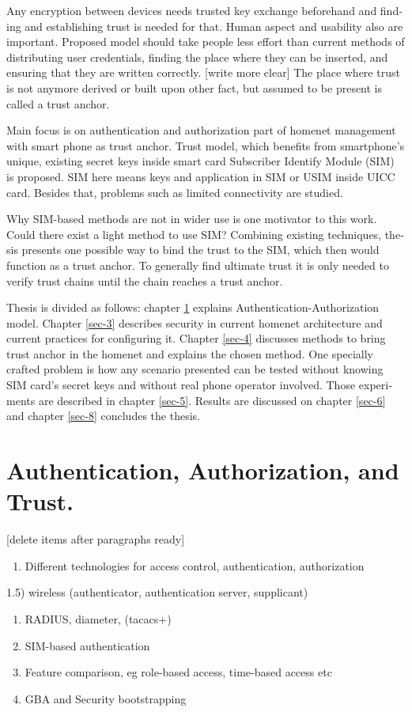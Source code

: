 \documentclass[12pt,a4paper,english]{tutthesis}
\begin{document}
\begin{otherlanguage}{english}
Any encryption between devices needs trusted key exchange
beforehand and finding and establishing trust is needed for that.
Human aspect and usability also are important. Proposed model should
take people less effort than current methods of distributing user
credentials, finding the place where they can be inserted, and
ensuring that they are written correctly. [write more clear]
The place where trust is not anymore derived or built upon other 
fact, but assumed to be present is called a trust anchor.

Main focus is on authentication and authorization part of
homenet management with smart phone as trust anchor.
Trust model, which benefits from smartphone's unique,
existing secret keys inside smart card Subscriber Identify Module
(SIM) is proposed. 
SIM here means keys and application in SIM or USIM inside UICC card. 
Besides that, problems such as limited connectivity are studied. 


Why SIM-based methods are not in wider use is one motivator to
this work. Could there exist a light method to use SIM?  Combining
existing techniques, thesis presents one possible way to bind the trust
to the SIM, which then would function as a trust anchor. To generally
find ultimate trust it is only needed to verify trust chains until the
chain reaches a trust anchor.




Thesis is divided as follows: chapter \ref{sec-2} explains Authentication-Authorization model.
Chapter \ref{sec-3} describes security in current homenet architecture and 
current practices for configuring it.
 Chapter \ref{sec-4}
discusses methods to bring trust anchor in the homenet and explains
the chosen method.
One specially crafted problem is how any scenario presented can be
tested without knowing SIM card's secret keys and without real phone
operator involved.  Those experiments are described in chapter
\ref{sec-5}.
Results are discussed on chapter  \ref{sec-6} and chapter \ref{sec-8} concludes the
thesis.
\chapter{Authentication, Authorization, and Trust.}
\label{sec-2}

[delete items after paragraphs ready]
\begin{enumerate}
\item Different technologies for access control, authentication,
authorization
\end{enumerate}
1.5) wireless (authenticator, authentication server, supplicant)
\begin{enumerate}
\item RADIUS, diameter, (tacacs+)
\item SIM-based authentication
\item Feature comparison, eg role-based access, time-based access etc
\item GBA and Security bootstrapping
\end{enumerate}


\end{otherlanguage}
\end{document}
